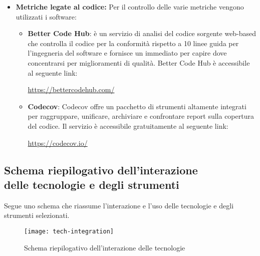 \documentclass[../NormediProgetto.tex]{subfiles}
\begin{document}
\begin{itemize}
		\item \textbf{Metriche legate al codice:} Per il controllo delle varie metriche vengono utilizzati i software:
		\begin{itemize}
			\item \textbf{Better Code Hub}:  è un servizio di analisi del codice sorgente web-based che controlla il codice per la conformità rispetto a 10 linee guida per l'ingegneria del software e fornisce un  immediato per capire dove concentrarsi per miglioramenti di qualità. Better Code Hub è accessibile al seguente link:
			\begin{center}
				\url{https://bettercodehub.com/}
			\end{center}
		
			
			\item \textbf{Codecov}: Codecov offre un pacchetto di strumenti altamente integrati per raggruppare, unificare, archiviare e confrontare report sulla copertura del codice. Il servizio è accessibile gratuitamente al seguente link: 
			\begin{center}
				\url{https://codecov.io/}
			\end{center}
		\end{itemize} 
	\end{itemize}

	
	\subsection{Schema riepilogativo dell'interazione \\ delle tecnologie e degli strumenti}
	
	Segue uno schema che riassume l'interazione e l'uso delle tecnologie e degli strumenti selezionati.
	
	\begin{figure}
		\texttt{[image: tech-integration]}
		\centering
		\caption{Schema riepilogativo dell'interazione delle tecnologie}
	\end{figure}
\end{document}
